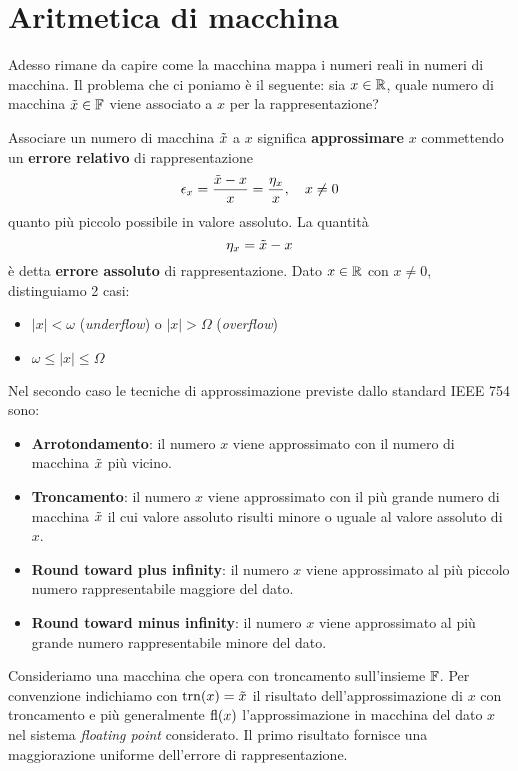 \section{Aritmetica di macchina}
Adesso rimane da capire come la macchina mappa i numeri reali in numeri di macchina. Il problema che ci
poniamo è il seguente: sia $x \in \mathbb{R}$, quale numero di macchina $\tilde{x} \in \mathbb{F}$ viene associato a $x$
per la rappresentazione?

Associare un numero di macchina $\tilde{x}$ a $x$ significa \textbf{approssimare} $x$ commettendo un
\textbf{errore relativo} di rappresentazione
\[ \epsilon_x = \frac{\tilde{x} - x}{x} = \frac{\eta_x}{x}, \quad x \neq 0 \]
quanto più piccolo possibile in valore assoluto. La quantità
\[ \eta_x = \tilde{x} - x \]
è detta \textbf{errore assoluto} di rappresentazione. Dato $x \in \mathbb{R}$ con $x \neq 0$, distinguiamo 2 casi:
\begin{itemize}
	\item $|x| < \omega$ (\emph{underflow}) o $|x| > \Omega$ (\emph{overflow})
	\item $\omega \leq |x| \leq \Omega$
\end{itemize}
Nel secondo caso le tecniche di approssimazione previste dallo standard IEEE 754 sono:
\begin{itemize}
	\item \textbf{Arrotondamento}: il numero $x$ viene approssimato con il numero di macchina $\tilde{x}$
	      più vicino.
	\item \textbf{Troncamento}: il numero $x$ viene approssimato con il più grande numero di macchina
	      $\tilde{x}$ il cui valore assoluto risulti minore o uguale al valore assoluto di $x$.
	\item \textbf{Round toward plus infinity}: il numero $x$ viene approssimato al più piccolo numero
	      rappresentabile maggiore del dato.
	\item \textbf{Round toward minus infinity}: il numero $x$ viene approssimato al più grande numero
	      rappresentabile minore del dato.
\end{itemize}
Consideriamo una macchina che opera con troncamento sull'insieme $\mathbb{F}$. Per convenzione indichiamo con
$\operatorname{trn}(x) = \tilde{x}$ il risultato dell'approssimazione di $x$ con troncamento e più generalmente $\operatorname{fl}(x)$
l'approssimazione in macchina del dato $x$ nel sistema \emph{floating point} considerato. Il primo risultato
fornisce una maggiorazione uniforme dell'errore di rappresentazione.

